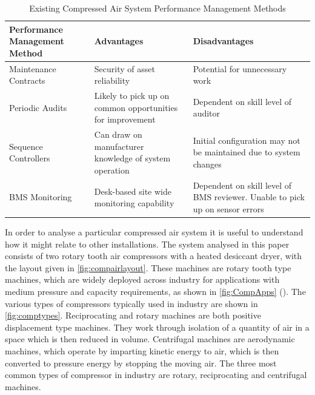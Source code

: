 \begin{table}
  \centering
  \caption{Existing Compressed Air System Performance Management Methods}
    \begin{tabular}{p{.3\linewidth}p{.3\linewidth}p{.3\linewidth}}
    \toprule
    Performance Management Method & Advantages & Disadvantages \\
    \midrule
    Maintenance Contracts & Security of asset reliability & Potential for unnecessary work \\
    Periodic Audits & Likely to pick up on common opportunities for improvement & Dependent on skill level of auditor \\
    Sequence Controllers & Can draw on manufacturer knowledge of system operation & Initial configuration may not be maintained due to system changes \\
    BMS Monitoring & Desk-based site wide monitoring capability & Dependent on skill level of BMS reviewer. Unable to pick up on sensor errors \\
    \bottomrule
    \end{tabular}%
  \label{tab:perfmgmt}%
\end{table}%



In order to analyse a particular compressed air system it is useful to understand how it might relate to other installations. The system analysed in this paper consists of two rotary tooth air compressors with a heated desiccant dryer, with the layout given in \autoref{fig:compairlayout}. These machines are rotary tooth type machines, which are widely deployed across industry for applications with medium pressure and capacity requirements, as shown in \autoref{fig:CompApps} (\cite{SEAI2007}). The various types of compressors typically used in industry are shown in \autoref{fig:comptypes}. Reciprocating and rotary machines are both positive displacement type machines. They work through isolation of a quantity of air in a space which is then reduced in volume. Centrifugal machines are aerodynamic machines, which operate by imparting kinetic energy to air, which is then converted to pressure energy by stopping the moving air. The three most common types of compressor in industry are rotary, reciprocating and centrifugal machines.

